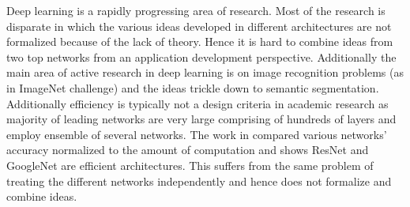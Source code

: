 \documentclass[conference]{IEEEtran}
\begin{document}
Deep learning is a rapidly progressing area of research. Most of the research is disparate in which the various ideas developed in different architectures are not formalized because of the lack of theory. Hence it is hard to combine ideas from two top networks from an application development perspective. Additionally the main area of active research in deep learning is on image recognition problems (as in ImageNet challenge) and the ideas trickle down to semantic segmentation. Additionally efficiency is typically not a design criteria in academic research as majority of leading networks are very large comprising of hundreds of layers and employ ensemble of several networks. The work in \cite{canziani2016analysis} compared various networks' accuracy normalized to the amount of computation and shows ResNet and GoogleNet are efficient architectures. This suffers from the same problem of treating the different networks independently and hence does not formalize and combine ideas. %
\end{document}
